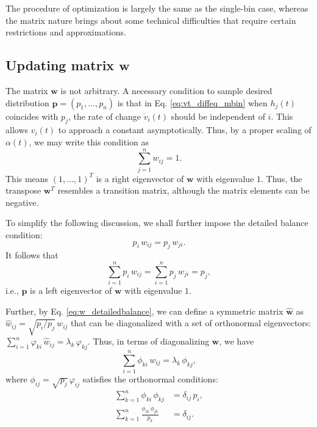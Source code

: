 \documentclass[reprint]{revtex4-1}
\begin{document}
The procedure of optimization is largely
the same as the single-bin case,
whereas the matrix nature brings about
some technical difficulties that require
certain restrictions and approximations.



\subsection{Updating matrix $\mathbf w$}



The matrix $\mathbf w$ is not arbitrary.
%
A necessary condition to sample desired distribution
$\mathbf p = (p_1, \dots, p_n)$
is that in Eq. \eqref{eq:vt_diffeq_mbin}
when $h_j(t)$ coincides with $p_j$,
the rate of change $\dot v_i(t)$
should be independent of $i$.
%
This allows $v_i(t)$ to approach a constant
asymptotically.
%
Thus, by a proper scaling of $\alpha(t)$,
we may write this condition as
%
\begin{equation}
  \sum_{j = 1}^n w_{ij} = 1.
  \label{eq:w_sumj}
\end{equation}
%
This means $(1, \dots, 1)^T$
is a right eigenvector of $\mathbf w$
with eigenvalue $1$.
%
Thus, the transpose $\mathbf w^T$
resembles a transition matrix,
although the matrix elements can be negative.



To simplify the following discussion,
we shall further impose the
detailed balance condition:
%
\begin{equation}
  p_i \, w_{ij} = p_j \, w_{ji}.
  \label{eq:w_detailedbalance}
\end{equation}
%
It follows that
\begin{equation}
  \sum_{i = 1}^n p_i \, w_{ij}
  =
  \sum_{i = 1}^n p_j \, w_{ji}
  = p_j,
  \label{eq:w_balance}
\end{equation}
%
i.e., $\mathbf p$ is a left eigenvector of
$\mathbf w$ with eigenvalue $1$.



Further, by Eq. \eqref{eq:w_detailedbalance},
we can define a symmetric matrix $\hat{\mathbf w}$
as $\hat w_{ij} = \sqrt{p_i/p_j} \, w_{ij}$
that can be diagonalized
with a set of orthonormal eigenvectors:
%
$\sum_{i = 1}^n \varphi_{ki} \, \hat w_{ij} = \lambda_k \, \varphi_{kj}$.
%
Thus,
in terms of diagonalizing $\mathbf w$, we have
\begin{equation}
  \sum_{i = 1}^n \phi_{ki} \, w_{ij} = \lambda_k \, \phi_{kj},
  \label{eq:eig_w}
\end{equation}
where
$\phi_{ij} = \sqrt{p_j} \, \varphi_{ij}$ satisfies
the orthonormal conditions:
%
\begin{align}
\sum_{k = 1}^n \phi_{ki} \, \phi_{kj}
&= \delta_{ij} \, p_i,
\label{eq:eig_orthonormal_cols}
\\
\sum_{k = 1}^n \frac{ \phi_{ik} \, \phi_{jk} }{ p_k }
&= \delta_{ij}.
\label{eq:eig_orthonormal_rows}
\end{align}
\end{document}

